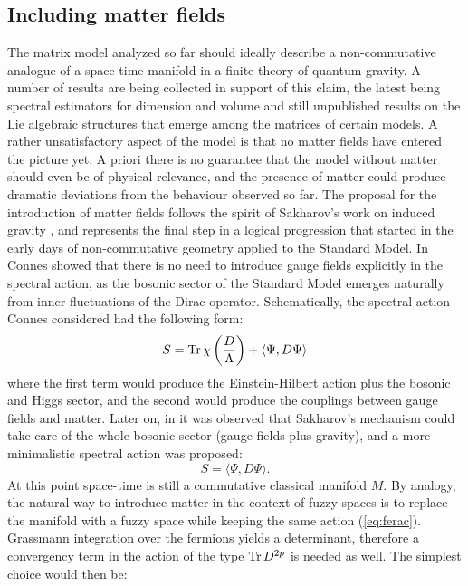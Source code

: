 \subsection{Including matter fields}
The matrix model analyzed so far should ideally describe a non-commutative analogue of a space-time manifold in a finite theory of quantum gravity. A number of results are being collected in support of this claim, the latest being spectral estimators for dimension and volume \cite{barrdruceglaser} and still unpublished results on the Lie algebraic structures that emerge among the matrices of certain models.\newline
A rather unsatisfactory aspect of the model is that no matter fields have entered the picture yet. A priori there is no guarantee that the model without matter should even be of physical relevance, and the presence of matter could produce dramatic deviations from the behaviour observed so far.\newline
The proposal for the introduction of matter fields follows the spirit of Sakharov's work on induced gravity \cite{sak}, and represents the final step in a logical progression that started in the early days of non-commutative geometry applied to the Standard Model. In \cite{connesGRAVMAT} Connes showed that there is no need to introduce gauge fields explicitly in the spectral action, as the bosonic sector of the Standard Model emerges naturally from inner fluctuations of the Dirac operator. Schematically, the spectral action Connes considered had the following form:
\begin{equation}
S = \operatorname{Tr} \chi \left( \frac{D}{\Lambda} \right) + \langle \Psi, D \Psi \rangle
\end{equation}
where the first term would produce the Einstein-Hilbert action plus the bosonic and Higgs sector, and the second would produce the couplings between gauge fields and matter. Later on, in \cite{barrettIND} it was observed that Sakharov's mechanism could take care of the whole bosonic sector (gauge fields plus gravity), and a more minimalistic spectral action was proposed:
\begin{equation}\label{eq:ferac}
S = \langle \Psi, D \Psi \rangle.
\end{equation}
At this point space-time is still a commutative classical manifold $M$. By analogy, the natural way to introduce matter in the context of fuzzy spaces is to replace the manifold with a fuzzy space while keeping the same action (\ref{eq:ferac}). Grassmann integration over the fermions yields a determinant, therefore a convergency term in the action of the type $\operatorname{Tr} D^{2p}$ is needed as well. The simplest choice would then be:
